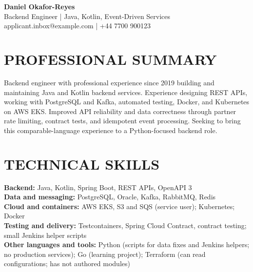 \documentclass[11pt,a4paper]{article}
\begin{document}
\begin{center}
{\Huge\bfseries\color{primarycolor} Daniel Okafor-Reyes}\\[0.35em]
{\large\color{accentcolor} Backend Engineer | Java, Kotlin, Event-Driven Services}\\[0.25em]
applicant.inbox@example.com | +44 7700 900123
\end{center}

\section*{PROFESSIONAL SUMMARY}
Backend engineer with professional experience since 2019 building and maintaining Java and Kotlin backend services. Experience designing REST APIs, working with PostgreSQL and Kafka, automated testing, Docker, and Kubernetes on AWS EKS. Improved API reliability and data correctness through partner rate limiting, contract tests, and idempotent event processing. Seeking to bring this comparable-language experience to a Python-focused backend role.

\section*{TECHNICAL SKILLS}
\textbf{Backend:} Java, Kotlin, Spring Boot, REST APIs, OpenAPI 3\\
\textbf{Data and messaging:} PostgreSQL, Oracle, Kafka, RabbitMQ, Redis\\
\textbf{Cloud and containers:} AWS EKS, S3 and SQS (service user); Kubernetes; Docker\\
\textbf{Testing and delivery:} Testcontainers, Spring Cloud Contract, contract testing; small Jenkins helper scripts\\
\textbf{Other languages and tools:} Python (scripts for data fixes and Jenkins helpers; no production services); Go (learning project); Terraform (can read configurations; has not authored modules)
\end{document}
